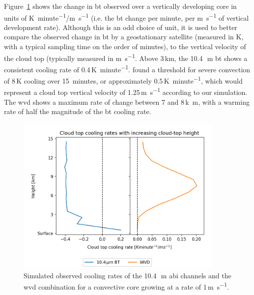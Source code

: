 Figure~\ref{fig:cloud_height_cooling_rates} shows the change in \acrshort{bt} observed over a vertically developing core in units of \unit{K minute^{-1}/m s^{-1}} (i.e. the \acrshort{bt} change per minute, per \unit{m s^{-1}} of vertical development rate).
Although this is an odd choice of unit, it is used to better compare the observed change in \acrshort{bt} by a geostationary satellite (measured in \unit{K}, with a typical sampling time on the order of minutes), to the vertical velocity of the cloud top (typically measured in \unit{m s^{-1}}.
Above 3\,\unit{km}, the 10.4\,\unit{\mu m} \acrshort{bt} shows a consistent cooling rate of 0.4\,\unit{K minute^{-1}}.
\citet{roberts_nowcasting_2003} found a threshold for severe convection of 8\,\unit{K} cooling over 15~minutes, or approximately 0.5\,\unit{K minute^{-1}}, which would represent a cloud top vertical velocity of 1.25\,\unit{m s^{-1}} according to our simulation.
The \acrshort{wvd} shows a maximum rate of change between 7 and 8\,\unit{k m}, with a warming rate of half the magnitude of the \acrshort{bt} cooling rate.


\begin{figure}[tp]
    \includegraphics[width=0.9\textwidth]{figures/chapter1_07.png}
    \caption[
    Simulated observed cooling rates of the 10.4\,\unit{\mu m} \acrshort{abi} channels and the \acrshort{wvd} combination for a convective core growing at a rate of 1\,\unit{m s^{-1}}
    ]{
    Simulated observed cooling rates of the 10.4\,\unit{\mu m} \acrshort{abi} channels and the \acrshort{wvd} combination for a convective core growing at a rate of 1\,\unit{m s^{-1}}.
    }
    \label{fig:cloud_height_cooling_rates}
\end{figure}


